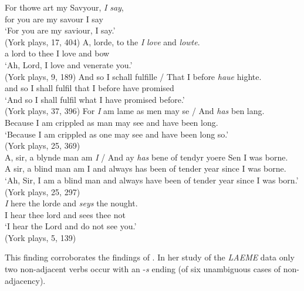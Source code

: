 \documentclass[output=paper]{langsci/langscibook}
\begin{document}
\ea
\label{york1}
\ea \gll For thowe art my Savyour, \textit{I} \textit{say},\\
for you are my savour I say \\
\glt `For you are my saviour, I say.'\\
(York plays, 17, 404)
\ex \gll A, lorde, to the \textit{I} \textit{love} and \textit{lowte}.\\
a lord  to thee I love and bow\\
\glt `Ah, Lord, I love and venerate you.'\\
(York plays, 9, 189)
\ex \gll And so I schall fulfille / That I before \textit{haue} highte.\\
and so I shall fulfil {} that I before have promised \\
\glt `And so I shall fulfil what I have promised before.'\\
(York plays, 37, 396)
\z
\ex\label{york2}
\ea
\gll For \textit{I} am lame as men may se / And \textit{has} ben lang. \\
Because I am crippled as man may see {} and have been long.\\
\glt `Because I am crippled as one may see and have been long so.'\\
(York plays, 25, 369)\\
\ex \gll A, sir, a blynde man am \textit{I} / And ay \textit{has} bene of tendyr yoere Sen
I was borne.\\
A sir, a blind man am I {} and always has been of tender year since I was borne.\\
\glt `Ah, Sir, I am a blind man and always have been of tender year since I was born.'\\
(York plays, 25, 297)\\
\ex \gll \textit{I} here the lorde and \textit{seys} the nought.\\
I hear thee lord and sees thee not\\
\glt `I hear the Lord and do not see you.'\\
(York plays, 5, 139)\\
\z
\z

This finding corroborates the findings of \textcite{Fernandez-Cuesta:2011}. In
her study of the \emph{LAEME} data only two non-adjacent \Fsg{} verbs occur
with an -\emph{s} ending (of six unambiguous cases of non-adjacency).
\end{document}
